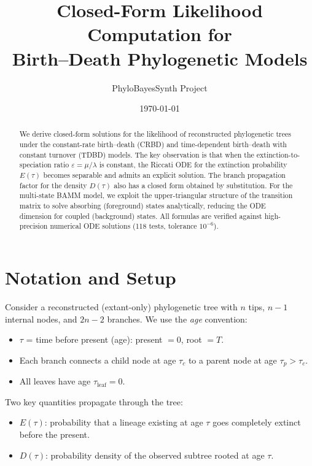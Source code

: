 \documentclass[11pt,a4paper]{article}
\title{\bfseries Closed-Form Likelihood Computation for \\Birth--Death Phylogenetic Models}
\author{PhyloBayesSynth Project}
\date{\today}
\newcommand{\eps}{\varepsilon}
\theoremstyle{plain}
\theoremstyle{definition}
\theoremstyle{remark}
\begin{document}
\maketitle

\begin{abstract}
We derive closed-form solutions for the likelihood of reconstructed phylogenetic trees under the constant-rate birth--death (CRBD) and time-dependent birth--death with constant turnover (TDBD) models.
The key observation is that when the extinction-to-speciation ratio $\eps = \mu/\lambda$ is constant, the Riccati ODE for the extinction probability $E(\tau)$ becomes separable and admits an explicit solution.
The branch propagation factor for the density $D(\tau)$ also has a closed form obtained by substitution.
For the multi-state BAMM model, we exploit the upper-triangular structure of the transition matrix to solve absorbing (foreground) states analytically, reducing the ODE dimension for coupled (background) states.
All formulas are verified against high-precision numerical ODE solutions (118 tests, tolerance $10^{-6}$).
\end{abstract}

\tableofcontents

\section{Notation and Setup}

Consider a reconstructed (extant-only) phylogenetic tree with $n$ tips, $n-1$ internal nodes, and $2n-2$ branches.
We use the \emph{age} convention:
\begin{itemize}[nosep]
  \item $\tau$ = time before present (age): present $=0$, root $=T$.
  \item Each branch connects a child node at age $\tau_c$ to a parent node at age $\tau_p > \tau_c$.
  \item All leaves have age $\tau_{\text{leaf}} = 0$.
\end{itemize}

Two key quantities propagate through the tree:
\begin{itemize}[nosep]
  \item $E(\tau)$: probability that a lineage existing at age $\tau$ goes completely extinct before the present.
  \item $D(\tau)$: probability density of the observed subtree rooted at age $\tau$.
\end{itemize}
\end{document}
